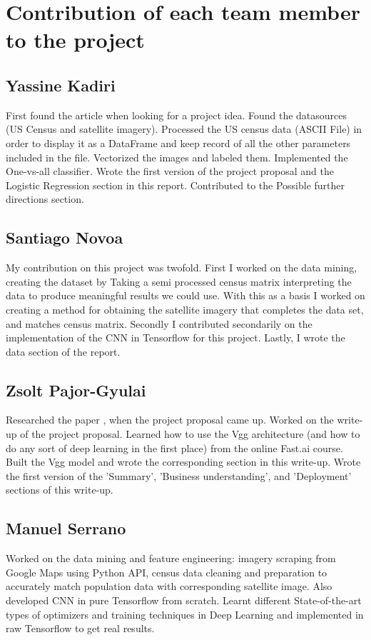 \documentclass{article}
\begin{document}
\appendix
\section{Contribution of each team member to the project}
\subsection{Yassine Kadiri}
First found the article when looking for a project idea. Found the datasources (US Census and satellite imagery). Processed the US census data (ASCII File) in order to display it as a DataFrame and keep record of all the other parameters included in the file. Vectorized the images and labeled them. Implemented the One-vs-all classifier. Wrote the first version of the project proposal and the Logistic Regression section in this report. Contributed to the Possible further directions section.
\subsection{Santiago Novoa}
My contribution on this project was twofold.
First I worked on the data mining, creating the dataset by Taking a semi processed census matrix interpreting the data to produce meaningful results we could use. With this as a basis I worked on creating a method for obtaining the satellite imagery that completes the data set, and matches census matrix.
Secondly I contributed secondarily on the implementation of the CNN in Tensorflow for this project. Lastly, I wrote the data section of the report.
\subsection{Zsolt Pajor-Gyulai}
Researched the paper \cite{RHD17}, when the project proposal came up. Worked on the write-up of the project proposal. Learned how to use the Vgg architecture (and how to do any sort of deep learning in the first place) from the online Fast.ai course. Built the Vgg model and wrote the corresponding section in this write-up. Wrote the first version of the 'Summary', 'Business understanding', and 'Deployment' sections of this write-up.
\subsection{Manuel Serrano}

Worked on the data mining and feature engineering: imagery scraping from Google Maps using Python API, census data cleaning and preparation to accurately match population data with corresponding satellite image. Also developed CNN in pure Tensorflow from scratch. Learnt different State-of-the-art types of optimizers and training techniques in Deep Learning and implemented in raw Tensorflow to get real results.
\end{document}
